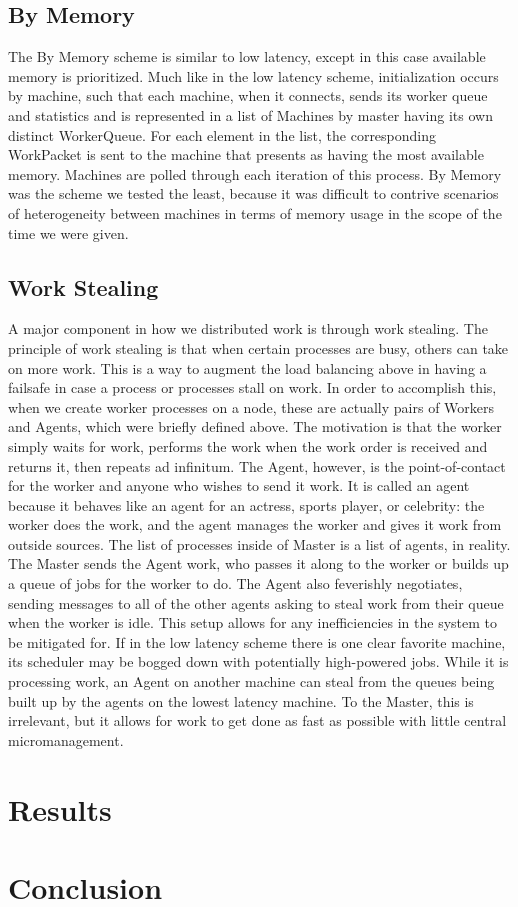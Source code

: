 \documentclass[letterpaper,twocolumn,10pt]{article}
\begin{document}
\subsection{By Memory}

The By Memory scheme is similar to low latency, except in this case available memory is prioritized.
Much like in the low latency scheme, initialization occurs by machine, such that each machine, when it
connects, sends its worker queue and statistics and is represented in a list of Machines by master having its
own distinct WorkerQueue. For each element in the list, the corresponding WorkPacket is sent to the
machine that presents as having the most available memory. Machines are polled through each iteration of this
process. By Memory was the scheme we tested the least, because it was difficult to contrive scenarios of
heterogeneity between machines in terms of memory usage in the scope of the time we were given.

\subsection{Work Stealing}

A major component in how we distributed work is through work stealing. The principle of work stealing is that
when certain processes are busy, others can take on more work. This is a way to augment the load balancing above
in having a failsafe in case a process or processes stall on work. In order to accomplish this, when we create worker
processes on a node, these are actually pairs of Workers and Agents, which were briefly defined above. The motivation is
that the worker simply waits for work, performs the work when the work order is received and returns it, then repeats ad
infinitum. The Agent, however, is the point-of-contact for the worker and anyone who wishes to send it work. It is called
an agent because it behaves like an agent for an actress, sports player, or celebrity: the worker does the work, and the agent
manages the worker and gives it work from outside sources. The list of processes inside of Master is a list of agents, in reality.
The Master sends the Agent work, who passes it along to the worker or builds up a queue of jobs for the worker to do.
The Agent also feverishly negotiates, sending messages to all of the other agents asking to steal work from their queue
when the worker is idle. This setup allows for any inefficiencies in the system to be mitigated for. If in the low latency scheme
there is one clear favorite machine, its scheduler may be bogged down with potentially high-powered jobs. While it is processing
work, an Agent on another machine can steal from the queues being built up by the agents on the lowest latency machine. To the Master,
this is irrelevant, but it allows for work to get done as fast as possible with little central micromanagement.

\section{Results}

\section{Conclusion}
\end{document}
